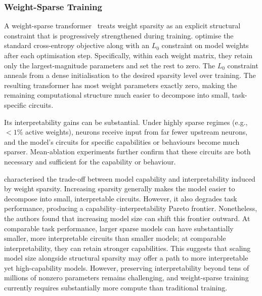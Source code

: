 \subsubsection{Weight-Sparse Training}
\label{subsubsec: weight sparse transformer}
A weight-sparse transformer~ treats weight sparsity as an explicit structural constraint that is progressively strengthened during training.  optimise the standard cross-entropy objective along with an $L_0$ constraint on model weights after each optimisation step. Specifically, within each weight matrix, they retain only the largest-magnitude parameters and set the rest to zero. The $L_0$ constraint anneals from a dense initialisation to the desired sparsity level over training. The resulting transformer has most weight parameters exactly zero, making the remaining computational structure much easier to decompose into small, task-specific circuits.

Its interpretability gains can be substantial. Under highly sparse regimes (e.g., $<1\%$ active weights), neurons receive input from far fewer upstream neurons, and the model’s circuits for specific capabilities or behaviours become much sparser. Mean-ablation experiments further confirm that these circuits are
both necessary and sufficient for the capability or behaviour.

 characterised the trade-off between model capability and interpretability induced by weight sparsity. Increasing sparsity generally makes the model easier to decompose into small, interpretable circuits. However, it also degrades task performance, producing a capability--interpretability Pareto frontier. Nonetheless, the authors found that increasing model size can shift this frontier outward. At comparable task performance, larger sparse models can have substantially smaller, more interpretable circuits than smaller models; at comparable interpretability, they can retain stronger capabilities. This suggests that scaling model size alongside structural sparsity may offer a path to more interpretable yet high-capability models. However, preserving interpretability beyond tens of millions of nonzero parameters remains challenging, and weight-sparse training currently requires substantially more compute than traditional training.

